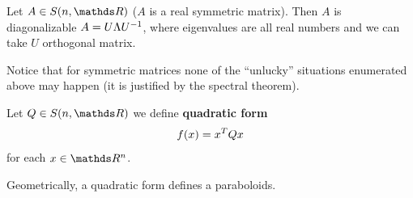 \documentclass[ComputationalMathematics.tex]{subfiles}
\begin{document}
\begin{theorem}
  Let $A \in S(n, \R)$ ($A$ is a real symmetric matrix). Then $A$ is diagonalizable $A = U\Lambda {U}^{-1}$, where eigenvalues are all real numbers and we can take $U$ orthogonal matrix.
\end{theorem}


Notice that for symmetric matrices none of the ``unlucky'' situations enumerated above may happen (it is justified by the spectral theorem).


\begin{definition}
  Let $Q \in S(n, \R)$ we define \textbf{quadratic form}
  \[
    f(x) = {x}^{T} Q x
  \]
  for each $x \in \R^{n}$.
\end{definition}

Geometrically, a quadratic form defines a paraboloids.
\end{document}
